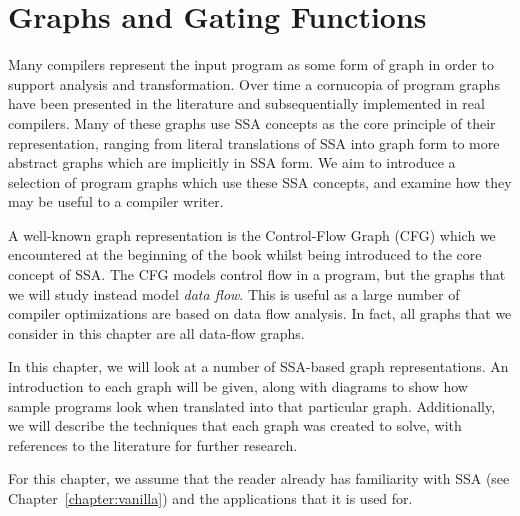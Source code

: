 \chapter{Graphs and Gating Functions }
\label{chapter:vsdg}


\newcommand{\Gn}{$\gamma$-node}
\newcommand{\Gns}{$\gamma$-nodes}
\newcommand{\Tn}{$\theta$-node}
\newcommand{\Tns}{$\theta$-nodes}
\newcommand{\Ttns}{$\theta^{\mathit{tail}}$-nodes}
\newcommand{\triVM}{\textit{tri}VM}

\newcommand{\instruction}[1]{\texttt{#1}}
\newcommand{\register}[1]{\texttt{v#1}}

Many compilers represent the input program as some form of graph in order to support analysis and transformation. 
Over time a cornucopia of program graphs have been presented in the literature and subsequentially implemented in real compilers. 
Many of these graphs use SSA concepts as the core principle of their representation, ranging from literal translations of SSA into graph form to more abstract graphs which are implicitly in SSA form. 
We aim to introduce a selection of program graphs which use these SSA concepts, and examine how they may be useful to a compiler writer.

A well-known graph representation is the Control-Flow Graph (CFG) which we encountered at the beginning of the book whilst being introduced to the core concept of SSA. The CFG models control flow in a program, but the graphs that we will study instead model \textit{data flow}. This is useful as a large number of compiler optimizations are based on data flow analysis. In fact, all graphs that we consider in this chapter are all data-flow graphs. 

In this chapter, we will look at a number of SSA-based graph representations. An introduction to each graph will be given, along with diagrams to show how sample programs look when translated into that particular graph. Additionally, we will describe the techniques that each graph was created to solve, with references to the literature for further research.

For this chapter, we assume that the reader already has familiarity with SSA (see Chapter~\ref{chapter:vanilla}) and the applications that it is used for.

